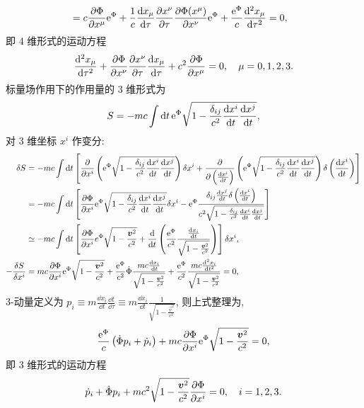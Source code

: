 \begin{solution}
\begin{align*}
        &= c \frac{\partial \Phi}{\partial x^\mu} \mathrm e^\Phi + \frac{1}{c} \frac{\dd x_\mu}{\dd \tau} \frac{\partial x^\nu}{\partial \tau} \frac{\partial \Phi (x^\mu)}{\partial x^\nu} \mathrm e^\Phi + \frac{\mathrm e^\Phi}{c} \frac{\dd^2 x_\mu}{\dd \tau^2} = 0,
    \end{align*}
    即 4 维形式的运动方程
    \[
        \frac{\dd^2 x_\mu}{\dd \tau^2} + \frac{\partial \Phi}{\partial x^\nu} \frac{\partial x^\nu}{\partial \tau} \frac{\dd x_\mu}{\dd \tau} + c^2 \frac{\partial \Phi}{\partial x^\mu} = 0, \quad \mu = 0, 1, 2, 3.
    \]
    标量场作用下的作用量的 3 维形式为
    \[
        S = - m c \int \dd t\,\mathrm e^\Phi \sqrt{1- \frac{\delta_{ij}}{c^2} \frac{\dd x^i}{\dd t} \frac{\dd x^j}{\dd t}},
    \]
    对 3 维坐标 $x^i$ 作变分:
    \begin{align*}
        \delta S &= - mc \int \dd t \left[\frac{\partial}{\partial x^i} \left(\mathrm e^\Phi \sqrt{1- \frac{\delta_{ij}}{c^2} \frac{\dd x^i}{\dd t} \frac{\dd x^j}{\dd t}}\right) \delta x^i + \frac{\partial}{\partial \left(\frac{\dd x^i}{\dd t}\right)} \left(\mathrm e^\Phi \sqrt{1- \frac{\delta_{ij}}{c^2} \frac{\dd x^i}{\dd t} \frac{\dd x^j}{\dd t}}\right) \delta \left(\frac{\dd x^i}{\dd t}\right)\right] \\
        &= - mc \int \dd t \left[\frac{\partial \Phi}{\partial x^i} \mathrm e^\Phi \sqrt{1- \frac{\delta_{ij}}{c^2} \frac{\dd x^i}{\dd t} \frac{\dd x^j}{\dd t}} \delta x^i - \mathrm e^\Phi \frac{\delta_{ij} \frac{\dd x^j}{\dd t} \delta \left(\frac{\dd x^i}{\dd t}\right)}{c^2 \sqrt{1- \frac{\delta_{ij}}{c^2} \frac{\dd x^i}{\dd t} \frac{\dd x^j}{\dd t}}}\right] \\
        & \simeq - mc \int \dd t \left[\frac{\partial \Phi}{\partial x^i} e^\Phi \sqrt{1 - \frac{\boldsymbol{v}^2}{c^2}} + \frac{\dd}{\dd t} \left(\frac{\mathrm e^\Phi}{c^2} \frac{\frac{\dd x_i}{\dd t}}{\sqrt{1 - \frac{\boldsymbol{v}^2}{c^2}}}\right)\right] \delta  x^i, \\
        - \frac{\delta S}{\delta x^i} &= m c \frac{\partial \Phi}{\partial x^i} \mathrm e^\Phi \sqrt{1 - \frac{\boldsymbol{v}^2}{c^2}} + \frac{\mathrm e^\Phi}{c^2} \dot{\Phi} \frac{mc \frac{\dd x_i}{\dd t}}{\sqrt{1 - \frac{\boldsymbol{v}^2}{c^2}}} + \frac{\mathrm e^\Phi}{c^2} \frac{mc \frac{\dd^2 x_i}{\dd t^2}}{\sqrt{1 - \frac{\boldsymbol{v}^2}{c^2}}} = 0,
    \end{align*}
    3-动量定义为 $p_i \equiv m \frac{\dd x_i}{\dd t} \frac{\dd t}{\dd \tau} \equiv m \frac{\dd x_i}{\dd t} \frac{1}{\sqrt{1 - \frac{\vec{v}^2}{c^2}}}$, 则上式整理为, 
    \[
        \frac{\mathrm e^\Phi}{c} \left(\dot{\Phi} p_i + \dot{p}_i\right) + mc \frac{\partial \Phi}{\partial x^i} \mathrm e^\Phi \sqrt{1 - \frac{\boldsymbol{v}^2}{c^2}} = 0,
    \]
    即 3 维形式的运动方程
    \[
        \dot{p}_i + \dot{\Phi} p_i + mc^2 \sqrt{1 - \frac{\boldsymbol{v}^2}{c^2}} \frac{\partial \Phi}{\partial x^i} = 0, \quad i = 1, 2, 3.
    \]
\end{solution}



